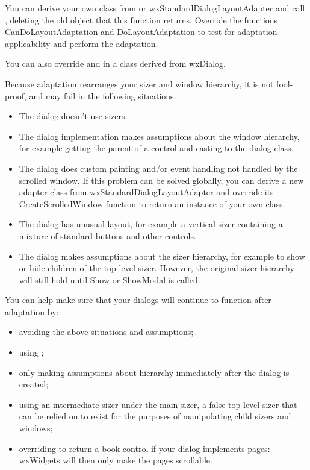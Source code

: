 You can derive your own class from  or wxStandardDialogLayoutAdapter and call\rtfsp
{}, deleting the old object that this function returns. Override
the functions CanDoLayoutAdaptation and DoLayoutAdaptation to test for adaptation applicability and perform the adaptation.

You can also override  and  in a class derived from wxDialog.


Because adaptation rearranges your sizer and window hierarchy, it is not fool-proof, and may fail in the following situations.

\begin{itemize}
\item The dialog doesn't use sizers.
\item The dialog implementation makes assumptions about the window hierarchy, for example getting the parent of a control and casting to the dialog class.
\item The dialog does custom painting and/or event handling not handled by the scrolled window. If this problem can be solved globally,
you can derive a new adapter class from wxStandardDialogLayoutAdapter and override its CreateScrolledWindow function to return an instance of your own class.
\item The dialog has unusual layout, for example a vertical sizer containing a mixture of standard buttons and other controls.
\item The dialog makes assumptions about the sizer hierarchy, for example to show or hide children of the top-level sizer. However, the original sizer hierarchy will still hold
until Show or ShowModal is called.
\end{itemize}

You can help make sure that your dialogs will continue to function after adaptation by:

\begin{itemize}
\item avoiding the above situations and assumptions;
\item using ;
\item only making assumptions about hierarchy immediately after the dialog is created;
\item using an intermediate sizer under the main sizer, a false top-level sizer that can be relied on to exist
for the purposes of manipulating child sizers and windows;
\item overriding  to return a book control if your dialog implements pages: wxWidgets will then only make the pages
scrollable.
\end{itemize}

